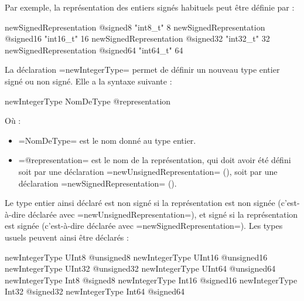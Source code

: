 Par exemple, la représentation des entiers signés habituels peut être définie par :
\begin{PLM}
newSignedRepresentation @signed8  "int8_t"   8
newSignedRepresentation @signed16 "int16_t" 16
newSignedRepresentation @signed32 "int32_t" 32
newSignedRepresentation @signed64 "int64_t" 64
\end{PLM}












La déclaration \plm=newIntegerType= permet de définir un nouveau type entier signé ou non signé. Elle a la syntaxe suivante :
\begin{PLM}
newIntegerType NomDeType @representation
\end{PLM}
Où :
\begin{itemize}
  \item \plm=NomDeType= est le nom donné au type entier.
  \item \plm=@representation= est le nom de la représentation, qui doit avoir été défini soit par une déclaration \plm=newUnsignedRepresentation= (), soit par une déclaration \plm=newSignedRepresentation= ().
\end{itemize}

Le type entier ainsi déclaré est non signé si la représentation est non signée (c'est-à-dire déclarée avec \plm=newUnsignedRepresentation=), et signé si la représentation est signée (c'est-à-dire déclarée avec \plm=newSignedRepresentation=). Les types usuels peuvent ainsi être déclarés :
\begin{PLM}
newIntegerType UInt8  @unsigned8
newIntegerType UInt16 @unsigned16
newIntegerType UInt32 @unsigned32
newIntegerType UInt64 @unsigned64
newIntegerType Int8  @signed8
newIntegerType Int16 @signed16
newIntegerType Int32 @signed32
newIntegerType Int64 @signed64
\end{PLM}




